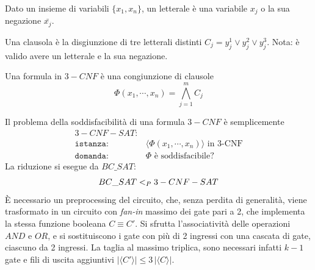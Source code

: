 \begin{definition}[Letterale]
    \label{def:letterale}
    Dato un insieme di variabili $\{ x_1, x_n \}$, un letterale è una variabile $x_j$ o la sua negazione $\bar{x_j}$.
\end{definition}

\begin{definition}[Clausola]
    \label{def:clausola}
    Una clausola è la disgiunzione di tre letterali distinti $C_j =y_j^1 \vee y_j^2 \vee y_j^3$.
    Nota: è valido avere un letterale e la sua negazione.
\end{definition}

\begin{definition}
    Una formula in $3-CNF$ è una congiunzione di clausole
    \begin{equation*}
        \Phi \left( x_1, \cdots, x_n \right) = 
        \bigwedge\limits_{j=1}^{m}
        C_j
    \end{equation*}
    \label{def:formulacnf}
\end{definition}
Il problema della soddisfacibilità di una formula $3-CNF$ è semplicemente
\begin{align*}
    3-CNF-SAT: & \\
    \texttt{istanza:} \quad & \langle \Phi \left( x_1, \cdots, x_n \right) \rangle \text{ in 3-CNF} \\
    \texttt{domanda:} \quad & \Phi \text{ è soddisfacibile?}
\end{align*}
La riduzione si esegue da $BC\_SAT$:
\begin{equation*}
    BC\_SAT <_P 3-CNF-SAT
\end{equation*}
È necessario un preprocessing del circuito, che, senza perdita di generalità, viene trasformato in un circuito con \emph{fan-in} massimo dei gate pari a 2, che implementa la stessa funzione booleana $C \equiv C'$. Si sfrutta l'associatività delle operazioni $AND$ e $OR$, e si sostituiscono i gate con più di 2 ingressi con una cascata di gate, ciascuno da 2 ingressi. La taglia al massimo triplica, sono necessari infatti $k - 1$ gate e fili di uscita aggiuntivi $|\langle C' \rangle| \le 3 \, |\langle C \rangle|$.

